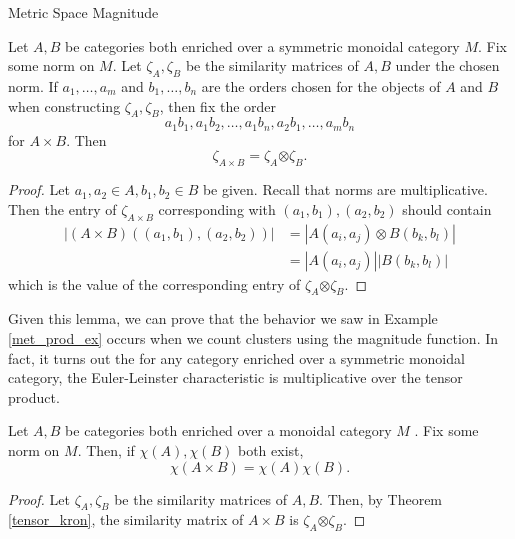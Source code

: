 \documentclass[12pt]{pom_thesis}
\newcommand{\kron}{\boldsymbol{\otimes}}
\begin{document}
\begin{chapter}{Metric Space Magnitude}
\begin{lemma}\label{tensor_kron}
Let $A, B$ be categories both enriched over a symmetric monoidal category $M$. Fix some norm on $M$. Let $\zeta_A, \zeta_B$ be the similarity matrices of $A,B$ under the chosen norm. If $a_1,\dots,a_m$ and $b_1,\dots,b_n$ are the orders chosen for the objects of $A$ and $B$ when constructing $\zeta_A, \zeta_B$, then fix the order \[a_1b_1, a_1b_2, \dots, a_1b_n, a_2b_1, \dots, a_mb_n\] for $A \times B$. Then
\[
\zeta_{A \times B} = \zeta_A \kron \zeta_B.
\]
\end{lemma}
\begin{proof}
Let $a_1, a_2 \in A, b_1, b_2 \in B$ be given. Recall that norms are multiplicative. Then the entry of $\zeta_{A \times B}$ corresponding with $(a_1, b_1), (a_2, b_2)$ should contain 
\begin{align*}
|(A \times B)((a_1, b_1), (a_2, b_2))|& = |A(a_i, a_j) \otimes B(b_k, b_l)|\\
&= |A(a_i, a_j)| |B(b_k, b_l)|
\end{align*}
which is the value of the corresponding entry of $\zeta_A \kron \zeta_B$.
\end{proof}

Given this lemma, we can prove that the behavior we saw in Example \ref{met_prod_ex} occurs when we count clusters using the magnitude function. In fact, it turns out the for any category enriched over a symmetric monoidal category, the Euler-Leinster characteristic is multiplicative over the tensor product. 

\begin{thm}
Let $A, B$ be categories both enriched over a monoidal category $M$ . Fix some norm on $M$. Then, if $\chi(A), \chi(B)$ both exist,
\[
\chi(A \times B) = \chi(A)\chi(B).
\]
\end{thm}
\begin{proof}
Let $\zeta_A, \zeta_B$ be the similarity matrices of $A,B$. Then, by Theorem \ref{tensor_kron}, the similarity matrix of $A \times B$ is $\zeta_A \kron \zeta_B$. 


\end{proof}
\end{chapter}
\end{document}
